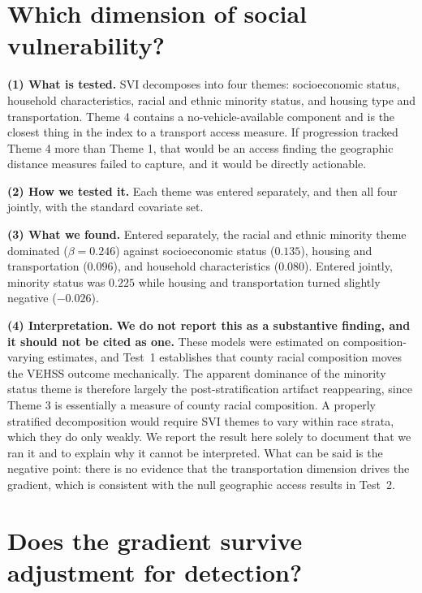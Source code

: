 \documentclass[11pt]{article}
\newcommand{\tpart}[1]{\medskip\noindent\textbf{#1}\quad}
\begin{document}
\section{Which dimension of social vulnerability?}

\tpart{(1) What is tested.}
SVI decomposes into four themes: socioeconomic status, household
characteristics, racial and ethnic minority status, and housing type and
transportation. Theme 4 contains a no-vehicle-available component and is the
closest thing in the index to a transport access measure. If progression tracked
Theme 4 more than Theme 1, that would be an access finding the geographic
distance measures failed to capture, and it would be directly actionable.

\tpart{(2) How we tested it.}
Each theme was entered separately, and then all four jointly, with the standard
covariate set.

\tpart{(3) What we found.}
Entered separately, the racial and ethnic minority theme dominated
($\beta = 0.246$) against socioeconomic status ($0.135$), housing and
transportation ($0.096$), and household characteristics ($0.080$). Entered
jointly, minority status was $0.225$ while housing and transportation turned
slightly negative ($-0.026$).

\tpart{(4) Interpretation.}
\textbf{We do not report this as a substantive finding, and it should not be
cited as one.} These models were estimated on composition-varying estimates, and
Test~1 establishes that county racial composition moves the VEHSS outcome
mechanically. The apparent dominance of the minority status theme is therefore
largely the post-stratification artifact reappearing, since Theme 3 is
essentially a measure of county racial composition. A properly stratified
decomposition would require SVI themes to vary within race strata, which they do
only weakly. We report the result here solely to document that we ran it and to
explain why it cannot be interpreted. What can be said is the negative point:
there is no evidence that the transportation dimension drives the gradient,
which is consistent with the null geographic access results in Test~2.

\section{Does the gradient survive adjustment for detection?}
\end{document}
